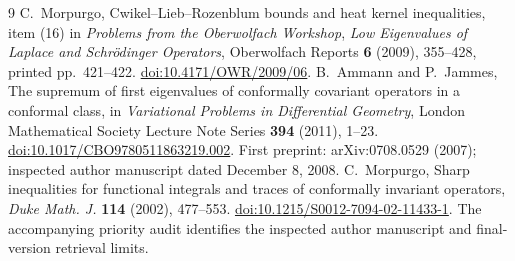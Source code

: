 \documentclass[10pt]{article}
\begin{document}
\begin{thebibliography}{9}
C.~Morpurgo, Cwikel--Lieb--Rozenblum bounds and heat kernel inequalities,
item (16) in \emph{Problems from the Oberwolfach Workshop},
\emph{Low Eigenvalues of Laplace and Schr\"odinger Operators},
Oberwolfach Reports \textbf{6} (2009), 355--428, printed pp.~421--422.
\href{https://doi.org/10.4171/OWR/2009/06}{doi:10.4171/OWR/2009/06}.
B.~Ammann and P.~Jammes,
The supremum of first eigenvalues of conformally covariant operators
in a conformal class, in \emph{Variational Problems in Differential Geometry},
London Mathematical Society Lecture Note Series \textbf{394}
(2011), 1--23.
\href{https://doi.org/10.1017/CBO9780511863219.002}
{doi:10.1017/CBO9780511863219.002}.
First preprint: arXiv:0708.0529 (2007); inspected author manuscript
dated December 8, 2008.
C.~Morpurgo, Sharp inequalities for functional integrals and traces
of conformally invariant operators,
\emph{Duke Math. J.} \textbf{114} (2002), 477--553.
\href{https://doi.org/10.1215/S0012-7094-02-11433-1}
{doi:10.1215/S0012-7094-02-11433-1}.
The accompanying priority audit identifies the inspected author manuscript
and final-version retrieval limits.
\end{thebibliography}
\end{document}
